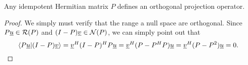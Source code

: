 \begin{theorem}
Any idempotent Hermitian matrix $P$ defines an orthogonal projection operator.
\end{theorem}
\begin{proof}
We simply must verify that the range a null space are orthogonal.
Since $P \underline{u} \in \mathcal{R}(P)$ and $(I-P) \underline{v} \in \mathcal{N}(P)$, we can simply point out that
\[ \langle P\underline{u} | (I-P)\underline{v} \rangle = \underline{v}^H (I-P)^H P \underline{u} = \underline{v}^H (P - P^H P) \underline{u} = \underline{v}^H (P - P^2) \underline{u} = 0. \]
\end{proof}


